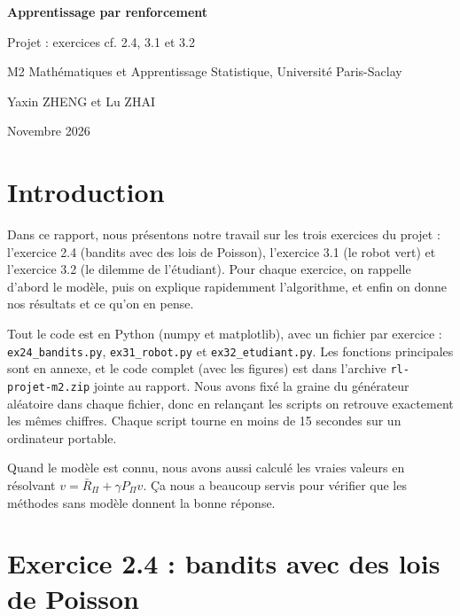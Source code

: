 \documentclass[11pt,a4paper]{article}
\begin{document}
\begin{titlepage}
  \centering
  \vspace*{4cm}
  {\LARGE\bfseries Apprentissage par renforcement\par}
  \vspace{0.6cm}
  {\Large Projet : exercices cf. 2.4, 3.1 et 3.2\par}
  \vspace{2.5cm}
  {\large M2 Mathématiques et Apprentissage Statistique, Université Paris-Saclay\par}
  \vspace{0.4cm}

  {\large Yaxin ZHENG et Lu ZHAI\par}
  \vspace{0.4cm}
  {\large Novembre 2026\par}
\end{titlepage}

\section*{Introduction}

Dans ce rapport, nous présentons notre travail sur les trois exercices du projet : l'exercice 2.4 (bandits avec des lois de Poisson), l'exercice 3.1 (le robot vert) et l'exercice 3.2 (le dilemme de l'étudiant). Pour chaque exercice, on rappelle d'abord le modèle, puis on explique rapidemment l'algorithme, et enfin on donne nos résultats et ce qu'on en pense.

Tout le code est en Python (numpy et matplotlib), avec un fichier par exercice : \texttt{ex24\_bandits.py}, \texttt{ex31\_robot.py} et \texttt{ex32\_etudiant.py}. Les fonctions principales sont en annexe, et le code complet (avec les figures) est dans l'archive \texttt{rl-projet-m2.zip} jointe au rapport. Nous avons fixé la graine du générateur aléatoire dans chaque fichier, donc en relançant les scripts on retrouve exactement les mêmes chiffres. Chaque script tourne en moins de 15 secondes sur un ordinateur portable.

Quand le modèle est connu, nous avons aussi calculé les vraies valeurs en résolvant $v = \bar R_\Pi + \gamma P_\Pi v$. Ça nous a beaucoup servis pour vérifier que les méthodes sans modèle donnent la bonne réponse.

\section{Exercice 2.4 : bandits avec des lois de Poisson}
\end{document}
